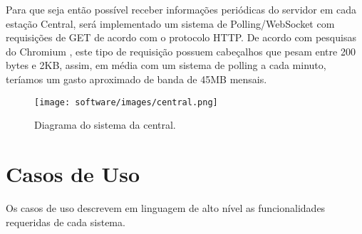     Para que seja então possível receber informações periódicas do servidor em cada estação Central, será implementado um sistema de Polling/WebSocket com requisições de GET de acordo com o protocolo HTTP. De acordo com pesquisas do Chromium \cite{chromium}, este tipo de requisição possuem cabeçalhos que pesam entre 200 bytes e 2KB, assim, em média com um sistema de polling a cada minuto, teríamos um gasto aproximado de banda de 45MB mensais.
    
    \begin{figure}[H]
    	\centering
        \texttt{[image: software/images/central.png]}
        \caption{Diagrama do sistema da central.}
        \label{fig:central}
    \end{figure}

    \section{Casos de Uso}
    
    Os casos de uso descrevem em linguagem de alto nível as funcionalidades requeridas de cada sistema.

